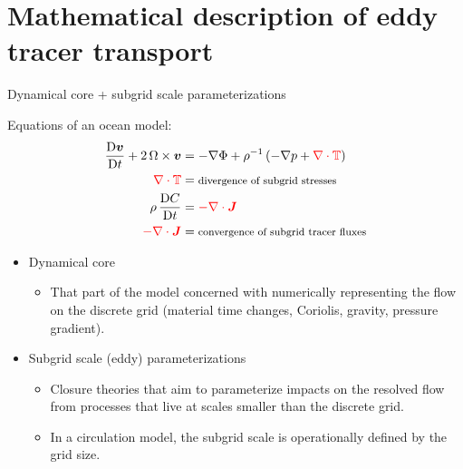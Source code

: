 \documentclass{beamer}
\begin{document}
\section{Mathematical description of eddy tracer transport}

\begin{frame}{Dynamical core + subgrid scale parameterizations}

 Equations of an ocean model:
\begin{subequations}
 \begin{align}
   \frac{\mathrm{D}{\bm v}}{\mathrm{D}t}
   +
   2 \, {\Omega} \times {\bm v}
   &=
   -\nabla \Phi
   +
   \rho^{-1} \, (-\nabla p +  \color{red} \nabla \cdot \mathbb{T} \color{black})
  \\
  \color{red} \nabla \cdot \mathbb{T} \color{black}
  &= \text{\footnotesize divergence of subgrid stresses} 
    \\
  \rho \, \frac{\mathrm{D}C}{\mathrm{D}t} &= \color{red}  -\nabla \cdot {\bm J} \color{black} 
  \\
  \color{red} -\nabla \cdot {\bm J} \color{black}
  &= \text{\footnotesize convergence of subgrid tracer fluxes} 
 \end{align}
\end{subequations}

\begin{itemize}
\item[$\star$] Dynamical core
  \begin{itemize}
    \footnotesize
  \item[$\bullet$] That part of the model concerned with numerically
    representing the flow on the discrete grid (material time changes,
    Coriolis, gravity, pressure gradient).
  \end{itemize}
\item[$\star$] \color{red} Subgrid scale (eddy) parameterizations
  \color{black}
  \begin{itemize}
     \footnotesize 
   \item[$\bullet$] Closure theories that aim to parameterize impacts
     on the resolved flow from processes that live at scales smaller
     than the discrete grid.
     \item[$\bullet$] In a circulation model, the subgrid scale is
       operationally defined by the grid size.
  \end{itemize}
\end{itemize}

\end{frame}
\end{document}
